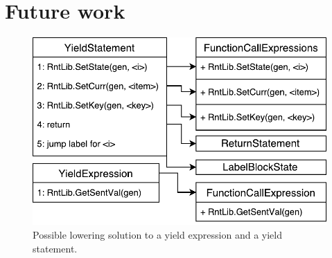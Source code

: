 \section{Future work}

\begin{figure}[h]
	\centering	
	\includegraphics[scale=0.75]{../img/6_6_yieldLowering}	
	\caption{Possible lowering solution to a yield expression and a yield statement.}
	\label{fig5.5:YieldInCond}
\end{figure}

